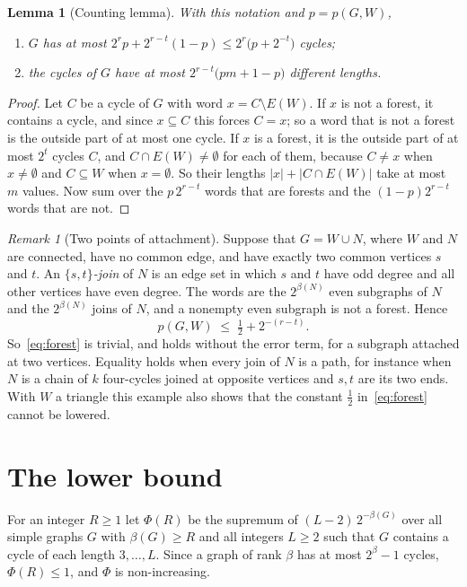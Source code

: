\documentclass[11pt]{article}
\newtheorem{lemma}[theorem]{Lemma}
\theoremstyle{definition}
\theoremstyle{remark}
\newtheorem{remark}[theorem]{Remark}
\newcommand{\sm}{\setminus}
\newcommand{\half}{\tfrac12}
\begin{document}
\begin{lemma}[Counting lemma]\label{lem:count}
With this notation and $p=p(G,W)$,
\begin{enumerate}
\item[\textup{(a)}] $G$ has at most $2^{r}p+2^{r-t}(1-p)\le2^{r}\bigl(p+2^{-t}\bigr)$ cycles;
\item[\textup{(b)}] the cycles of $G$ have at most $2^{r-t}\bigl(pm+1-p\bigr)$ different lengths.
\end{enumerate}
\end{lemma}

\begin{proof}
Let $C$ be a cycle of $G$ with word $x=C\sm E(W)$. If $x$ is not a forest, it contains a cycle, and
since $x\subseteq C$ this forces $C=x$; so a word that is not a forest is the outside part of at most
one cycle. If $x$ is a forest, it is the outside part of at most $2^{t}$ cycles $C$, and
$C\cap E(W)\ne\emptyset$ for each of them, because $C\ne x$ when $x\ne\emptyset$ and $C\subseteq W$
when $x=\emptyset$. So their lengths $|x|+|C\cap E(W)|$ take at most $m$ values. Now sum over the
$p\,2^{r-t}$ words that are forests and the $(1-p)2^{r-t}$ words that are not.
\end{proof}

\begin{remark}[Two points of attachment]\label{rem:twoports}
Suppose that $G=W\cup N$, where $W$ and $N$ are connected, have no common edge, and have exactly two
common vertices $s$ and $t$. An \emph{$\{s,t\}$-join} of $N$ is an edge set in which $s$ and $t$ have
odd degree and all other vertices have even degree. The words are the $2^{\beta(N)}$ even subgraphs of
$N$ and the $2^{\beta(N)}$ joins of $N$, and a nonempty even subgraph is not a forest. Hence
\[
  p(G,W)\;\le\;\tfrac12+2^{-(r-t)} .
\]
So~\eqref{eq:forest} is trivial, and holds without the error term, for a subgraph attached at two
vertices. Equality holds when every join of $N$ is a path, for instance when $N$ is a chain of $k$
four-cycles joined at opposite vertices and $s,t$ are its two ends. With $W$ a triangle this example
also shows that the constant $\half$ in~\eqref{eq:forest} cannot be lowered.
\end{remark}

\section{The lower bound}\label{sec:lower}

For an integer $R\ge1$ let $\Phi(R)$ be the supremum of $(L-2)\,2^{-\beta(G)}$ over all simple graphs
$G$ with $\beta(G)\ge R$ and all integers $L\ge2$ such that $G$ contains a cycle of each length
$3,\dots,L$. Since a graph of rank $\beta$ has at most $2^{\beta}-1$ cycles, $\Phi(R)\le1$, and
$\Phi$ is non-increasing.
\end{document}
